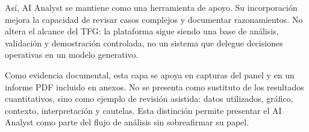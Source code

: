 As\'i, AI Analyst se mantiene como una herramienta de apoyo. Su incorporaci\'on
mejora la capacidad de revisar casos complejos y documentar razonamientos. No
altera el alcance del TFG: la plataforma sigue siendo una base de an\'alisis,
validaci\'on y demostraci\'on controlada, no un sistema que delegue decisiones
operativas en un modelo generativo.

Como evidencia documental, esta capa se apoya en capturas del panel y en un
informe PDF incluido en anexos. No se presenta como sustituto de los resultados
cuantitativos, sino como ejemplo de revisi\'on asistida: datos utilizados,
gr\'afico, contexto, interpretaci\'on y cautelas. Esta distinci\'on permite
presentar el AI Analyst como parte del flujo de an\'alisis sin sobreafirmar su
papel.
